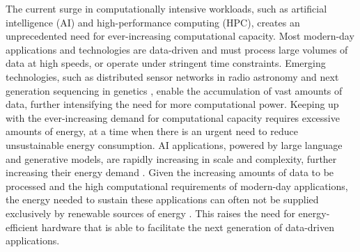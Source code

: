 


The current surge in computationally intensive workloads, such as artificial intelligence (AI) %
and high-performance computing (HPC), creates an unprecedented need for ever-increasing computational capacity. Most modern-day applications and technologies are data-driven and must process large volumes of data at high speeds, or operate under stringent time constraints. Emerging technologies, such as distributed sensor networks in radio astronomy \cite{big-data-radio-astronomy} and next generation sequencing in genetics \cite{genetic-big-data}, enable the accumulation of vast amounts of data, further intensifying the need for more %
computational power. %
Keeping up with the ever-increasing demand for computational capacity requires excessive amounts of energy, at a time when there is an urgent need to reduce unsustainable energy consumption. %
AI applications, powered by large language and generative models, are rapidly increasing in scale and complexity, further increasing their energy demand \cite{energy-llm}.
Given the increasing amounts of data to be processed and the high computational requirements of modern-day applications, the energy needed to sustain these applications can often not be supplied exclusively by renewable sources of energy \cite{green-data-centers, enegry-efficiency-cloud-dc}. This  %
raises the need for energy-efficient hardware that is able to facilitate the next generation of data-driven applications.

